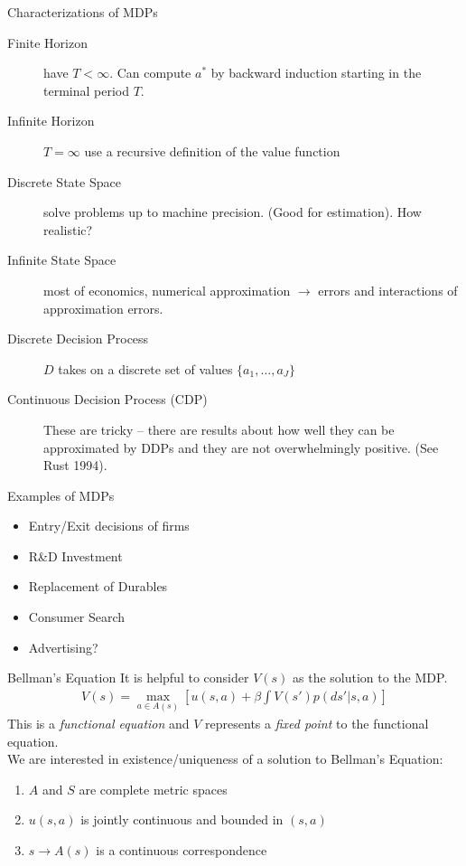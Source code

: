 \documentclass[xcolor=pdftex,dvipsnames,table,mathserif]{beamer}
\begin{document}
\begin{frame}{Characterizations of MDPs}
\begin{description}
\item[Finite Horizon] have $T < \infty$. Can compute $a^*$ by backward induction starting in the terminal period $T$.
\item[Infinite Horizon] $T=\infty$ use a recursive definition of the value function
\item[Discrete State Space] solve problems up to machine precision. (Good for estimation).  How realistic?
\item[Infinite State Space] most of economics, numerical approximation $\rightarrow$  errors and interactions of approximation errors.
\item [Discrete Decision Process] $D$ takes on a discrete set of values $\{a_1,\ldots,a_J\}$
\item[Continuous Decision Process (CDP)] These are tricky -- there are results about how well they can be approximated by DDPs and they are not overwhelmingly positive. (See Rust 1994).
\end{description}
\end{frame}

\begin{frame}{Examples of MDPs}
\begin{itemize}
\item Entry/Exit decisions of firms
\item R\&D Investment
\item Replacement of Durables
\item Consumer Search
\item Advertising?
\end{itemize}
\end{frame}

\begin{frame}{Bellman's Equation}
It is helpful to consider $V(s)$ as the solution to the MDP.  
\begin{eqnarray*}
V(s) = \max_{a \in A(s)} [ u(s,a) + \beta \int V(s') p(ds' | s,a)]
\end{eqnarray*}
This is a \textit{functional equation} and $V$ represents a \textit{fixed point} to the functional equation.\\
\vspace{0.5cm}
We are interested in existence/uniqueness of a solution to Bellman's Equation:
\begin{enumerate}
\item $A$ and $S$ are complete metric spaces
\item $u(s,a)$ is jointly continuous and bounded in $(s,a)$
\item $s \rightarrow A(s)$ is a continuous correspondence
\end{enumerate}
\end{frame}
\end{document}
